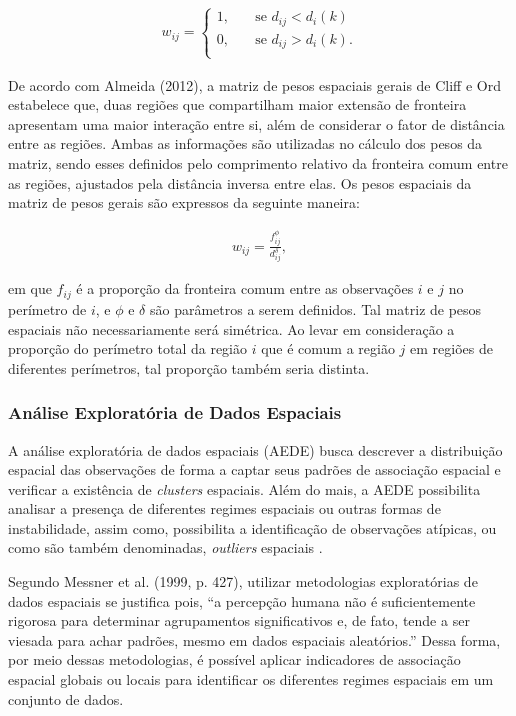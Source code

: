\documentclass[12pt,a4paper]{article}
\begin{document}
\begin{align}
	w_{ij} = 
	\begin{cases}
    	\text{$1,$} & \quad\text{se $d_{ij} < d_i(k)$} \\
	    \text{$0,$} & \quad\text{se $d_{ij} > d_i(k)$}.\\
	\end{cases}
	\label{W_prox}
\end{align}
	
De acordo com Almeida (2012), a matriz de pesos espaciais gerais de Cliff e Ord  estabelece que, duas regiões que compartilham maior extensão de fronteira apresentam uma maior interação entre si, além de considerar o fator de distância entre as regiões. Ambas as informações são utilizadas no cálculo dos pesos da matriz, sendo esses definidos pelo comprimento relativo da fronteira comum entre as regiões, ajustados pela distância inversa entre elas. Os pesos espaciais da matriz de pesos gerais são expressos da seguinte maneira:
	
\begin{align*}
	w_{ij} = \frac{f_{ij}^\phi}{d_{ij}^\delta},
\end{align*}
	
\noindent em que $f_{ij}$ é a proporção da fronteira comum entre as observações $i$ e $j$ no perímetro de $i$, e $\phi$ e $\delta$ são parâmetros a serem definidos. Tal matriz de pesos espaciais não necessariamente será simétrica. Ao levar em consideração a proporção do perímetro total da região $i$ que é comum a região $j$ em regiões de diferentes perímetros, tal proporção também seria distinta.
	

\subsubsection{Análise Exploratória de Dados Espaciais}


A análise exploratória de dados espaciais (AEDE) busca descrever a distribuição espacial das observações de forma a captar seus padrões de associação espacial e verificar a existência de \textit{clusters} espaciais. Além do mais, a AEDE possibilita analisar a presença de diferentes regimes espaciais ou outras formas de instabilidade, assim como, possibilita a identificação de observações atípicas, ou como são também denominadas, \textit{outliers} espaciais \cite{almeida12_2}.

Segundo Messner et al. (1999, p. 427), utilizar metodologias exploratórias de dados espaciais se justifica pois, “a percepção humana não é suficientemente rigorosa para determinar agrupamentos significativos e, de fato, tende a ser viesada para achar padrões, mesmo em dados espaciais aleatórios.” Dessa forma, por meio dessas metodologias, é possível aplicar indicadores de associação espacial globais ou locais para identificar os diferentes regimes espaciais em um conjunto de dados.
\end{document}
